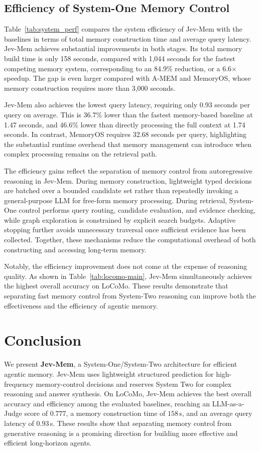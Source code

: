 \documentclass[11pt]{article}
\begin{document}
\subsection{Efficiency of System-One Memory Control}
\label{sec:efficiency}

Table~\ref{tab:system_perf} compares the system efficiency of Jev-Mem with the baselines in terms of total memory construction time and average query latency. Jev-Mem achieves substantial improvements in both stages. Its total memory build time is only 158 seconds, compared with 1,044 seconds for the fastest competing memory system, corresponding to an 84.9\% reduction, or a 6.6$\times$ speedup. The gap is even larger compared with A-MEM and MemoryOS, whose memory construction requires more than 3,000 seconds.

Jev-Mem also achieves the lowest query latency, requiring only 0.93 seconds per query on average. This is 36.7\% lower than the fastest memory-based baseline at 1.47 seconds, and 46.6\% lower than directly processing the full context at 1.74 seconds. In contrast, MemoryOS requires 32.68 seconds per query, highlighting the substantial runtime overhead that memory management can introduce when complex processing remains on the retrieval path.

The efficiency gains reflect the separation of memory control from autoregressive reasoning in Jev-Mem. During memory construction, lightweight typed decisions are batched over a bounded candidate set rather than repeatedly invoking a general-purpose LLM for free-form memory processing. During retrieval, System-One control performs query routing, candidate evaluation, and evidence checking, while graph exploration is constrained by explicit search budgets. Adaptive stopping further avoids unnecessary traversal once sufficient evidence has been collected. Together, these mechanisms reduce the computational overhead of both constructing and accessing long-term memory.

Notably, the efficiency improvement does not come at the expense of reasoning quality. As shown in Table~\ref{tab:locomo-main}, Jev-Mem simultaneously achieves the highest overall accuracy on LoCoMo. These results demonstrate that separating fast memory control from System-Two reasoning can improve both the effectiveness and the efficiency of agentic memory.

\section{Conclusion}
\label{sec:conclusion}
We present \textbf{Jev-Mem}, a System-One/System-Two architecture for efficient agentic memory. Jev-Mem uses lightweight structured prediction for high-frequency memory-control decisions and reserves System Two for complex reasoning and answer synthesis. On LoCoMo, Jev-Mem achieves the best overall accuracy and efficiency among the evaluated baselines, reaching an LLM-as-a-Judge score of $0.777$, a memory construction time of $158$\,s, and an average query latency of $0.93$\,s. These results show that separating memory control from generative reasoning is a promising direction for building more effective and efficient long-horizon agents.
\end{document}
